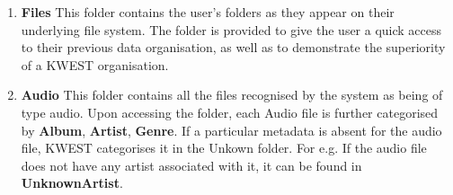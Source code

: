 \begin{enumerate}
\item \textbf{Files} \newline
This folder contains the user's folders as they  appear on their underlying file system. The folder is provided to give the user a quick access to their previous data organisation, as well as to demonstrate the superiority of a KWEST organisation.
\item \textbf{Audio} \newline
This folder contains all the files recognised by the system as being of type audio. Upon accessing the folder, each Audio file is further categorised by \textbf{Album}, \textbf{Artist}, \textbf{Genre}. If a particular metadata is absent for the audio file, KWEST categorises it in the Unkown folder. \newline
For e.g. If the audio file does not have any artist associated with it, it can be found in \textbf{UnknownArtist}.
\end{enumerate}